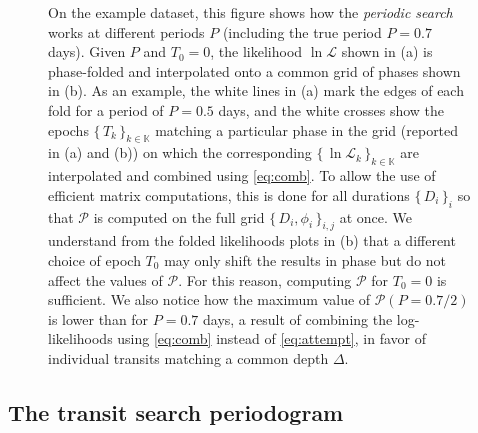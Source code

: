 \documentclass{aastex631}
\newcommand{\set}[1]{\{\,#1\,\}}
\begin{document}
\begin{figure}[H]
    \begin{centering}
        \vspace{-0.6cm}
        \caption{On the example dataset, this figure shows how the \textit{periodic search} works at different periods $P$ (including the true period $P = 0.7$ days). Given $P$ and $T_0=0$, the likelihood $\ln\mathcal{L}$ shown in (a) is phase-folded and interpolated onto a common grid of phases shown in (b). As an example, the white lines in (a) mark the edges of each fold for a period of $P=0.5$ days, and the white crosses show the epochs $\set{T_k}_{k\in\mathbb{K}}$ matching a particular phase in the grid (reported in (a) and (b)) on which the corresponding $\set{\ln \mathcal{L}_k}_{k\in\mathbb{K}}$ are interpolated and combined using \autoref{eq:comb}. To allow the use of efficient matrix computations, this is done for all durations $\set{D_i}_i$ so that $\mathcal{P}$ is computed on the full grid $\set{D_i, \phi_i}_{i, j}$ at once. We understand from the folded likelihoods plots in (b) that a different choice of epoch $T_0$ may only shift the results in phase but do not affect the values of $\mathcal{P}$. For this reason, computing $\mathcal{P}$ for $T_0=0$ is sufficient. We also notice how the maximum value of $\mathcal{P}(P=0.7/2)$ is lower than for $P=0.7$ days, a result of combining the log-likelihoods using \autoref{eq:comb} instead of \autoref{eq:attempt}, in favor of individual transits matching a common depth $\Delta$.}
        \label{fig:periodic_search}
    \end{centering}
\end{figure}



\subsection{The transit search periodogram}
\end{document}
